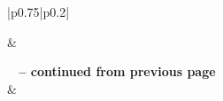 \documentclass[acmsmall,screen,authorversion,nonacm]{acmart}
\begin{document}
\begin{center}
    \begin{longtable}{|p{0.75\linewidth}|p{0.2\linewidth}|}
    \caption{Participant 1 Typing a Message}
    \label{tab:SimpUser1Task2}
    
    \hline {} &  \\ \hline 
    \endfirsthead
    
    {{\bfseries \tablename\ \thetable{} -- continued from previous page}} \\
    \hline {} &  \\ \hline 
    \endhead
    
    \hline {} \\ \hline
    \endfoot
    
    \hline \hline
    \endlastfoot
    

\end{longtable}
\end{center}
\end{document}
